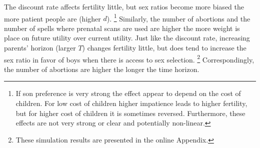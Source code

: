 \documentclass[12pt,letterpaper]{article}
\begin{document}









The discount rate affects fertility little, but sex ratios 
become more biased the more patient people are (higher $d$).%
\footnote{
If son preference is very strong the effect appear to 
depend on the cost of children. 
For low cost of children higher impatience leads to higher
fertility, but for higher cost of children it is sometimes reversed.
Furthermore, these effects are not very strong or clear and
potentially non-linear.
}
Similarly, the number of abortions and the number of spells where
prenatal scans are used are higher the more 
weight is place on future utility over current utility.
Just like the discount rate, increasing parents'  
horizon (larger $T$) changes fertility little, but does tend to 
increase the sex ratio in favor of boys when there is access 
to sex selection.%
\footnote{
These simulation results are presented in the online Appendix.
}
Correspondingly, the number of abortions are higher the 
longer the time horizon.
\end{document}
